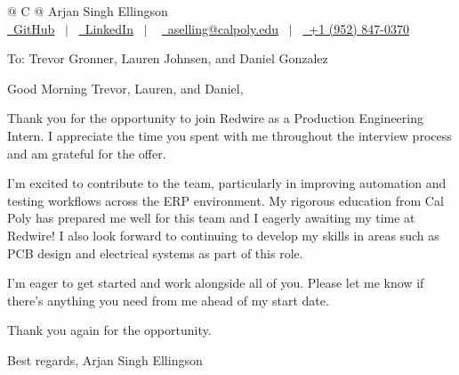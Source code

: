 \documentclass[a4paper,12pt]{article}
\begin{document}
\pagestyle{empty} 


\vspace{0.3in}
\begin{tabularx}{\linewidth}{@{} C @{}}
\Huge{Arjan Singh Ellingson} \\[7.5pt]
\href{https://github.com/asellingson28}{\raisebox{-0.05\height}\faGithub\ GitHub} \ $|$ \ 
\href{https://www.linkedin.com/in/arjan-singh-ellingson/}{\raisebox{-0.05\height}\faLinkedin\ LinkedIn} \ $|$ \ 
\href{mailto:aselling@calpoly.edu}{\raisebox{-0.05\height}\faEnvelope \ aselling@calpoly.edu} \ $|$ \ 
\href{tel:+19528470370}{\raisebox{-0.05\height}\faMobile \ +1 (952) 847-0370} \\
\end{tabularx}


\vspace{0.25in}


To: Trevor Gronner, Lauren Johnsen, and Daniel Gonzalez

\vspace{0.5in}
Good Morning Trevor, Lauren, and Daniel,

Thank you for the opportunity to join Redwire as a Production Engineering Intern. I appreciate the time you spent with me throughout the interview process and am grateful for the offer.

I'm excited to contribute to the team, particularly in improving automation and testing workflows across the ERP environment. My rigorous education from Cal Poly has prepared me well for this team and I eagerly awaiting my time at Redwire! I also look forward to continuing to develop my skills in areas such as PCB design and electrical systems as part of this role.

I'm eager to get started and work alongside all of you. Please let me know if there's anything you need from me ahead of my start date.

Thank you again for the opportunity.

Best regards,
Arjan Singh Ellingson
\vfill
\center{\footnotesize \today}
\end{document}
